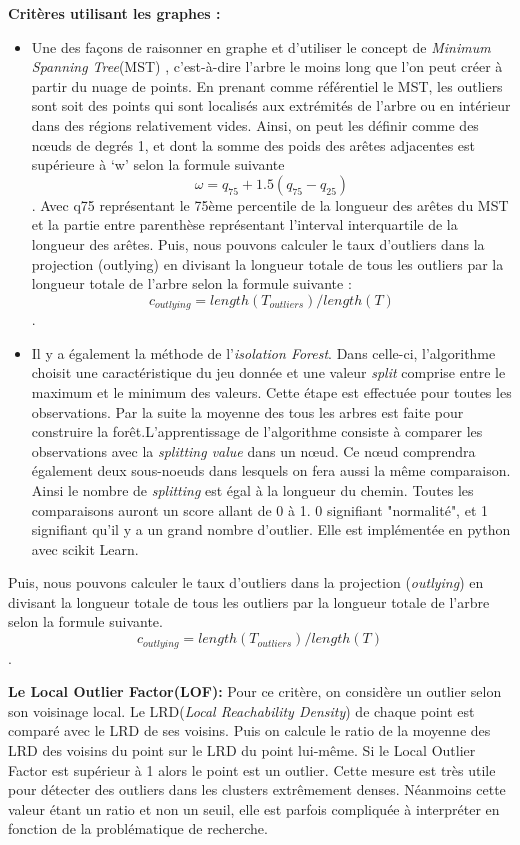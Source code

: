 \textbf{Critères utilisant les graphes :}
\begin{itemize}
    \item Une des façons de raisonner en graphe et d'utiliser le concept de \textit{Minimum Spanning Tree}(MST) \cite{wilkinson2005graph-MST} , c'est-à-dire l'arbre le moins long que l'on peut créer à partir du nuage de points. 
    En prenant comme référentiel le MST, les outliers sont soit des points qui sont localisés aux extrémités de l’arbre ou en intérieur dans des régions relativement vides. 
    Ainsi, on peut les définir comme des nœuds de degrés 1, et dont la somme des poids des arêtes adjacentes est supérieure à ‘w’ selon la formule suivante  \[ \omega = q_{75} + 1.5 (q_{75} - q_{25} ) \].
    Avec q75 représentant le 75ème percentile de la longueur des arêtes du MST et la partie entre parenthèse représentant l'interval interquartile de la longueur des arêtes.
    Puis, nous pouvons calculer le taux d’outliers dans la projection (outlying) en divisant la longueur totale de tous les outliers par la longueur totale de l’arbre selon la formule suivante : \[c_{outlying} = length(T_{outliers} )/length(T) \] .
    \item Il y a également la méthode de l’\textit{isolation Forest}. Dans celle-ci, l’algorithme choisit une caractéristique du jeu donnée et une valeur \textit{split} comprise entre le maximum et le minimum des valeurs. Cette étape est effectuée pour toutes les observations. 
    Par la suite la moyenne des tous les arbres est faite pour construire la forêt.L'apprentissage de l’algorithme consiste à comparer les observations avec la \textit{splitting value} dans un nœud. Ce nœud comprendra également deux sous-noeuds dans lesquels on fera aussi la même comparaison. 
    Ainsi le nombre de \textit{splitting} est égal à la longueur du chemin. Toutes les comparaisons auront un score allant de 0 à 1. 0 signifiant "normalité", et 1 signifiant qu’il y a un grand nombre d’outlier\cite{togbe2020anomaly-IsolationForest}. Elle est implémentée en python avec scikit Learn.
\end{itemize} 

Puis, nous pouvons calculer le taux d’outliers dans la projection (\textit{outlying}) en divisant la
longueur totale de tous les outliers par la longueur totale de l’arbre selon la formule suivante.
\[c_{outlying} = length(T_{outliers} )/length(T) \].

\smallskip

\textbf{Le Local Outlier Factor(LOF):}
\smallskip
Pour ce critère, on considère un outlier selon son voisinage local\cite{breunig2000lof}.
Le LRD(\textit{Local Reachability Density}) de chaque point est comparé avec le LRD de ses voisins. Puis on calcule le ratio de la moyenne des LRD des voisins du point sur le LRD du point lui-même. Si le Local Outlier Factor est supérieur à 1 alors le point est un outlier.
Cette mesure est très utile pour détecter des outliers dans les clusters extrêmement denses. Néanmoins cette valeur étant un ratio et non un seuil, elle est parfois compliquée à interpréter en fonction de la problématique de recherche.


